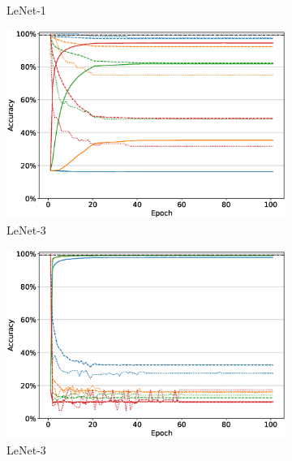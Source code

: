 \begin{figure}
\begin{subfigure}[b]{0.49\textwidth}
         \caption{LeNet-1}
         \label{fig:finetuning_lenet1_largelr}
     \end{subfigure}
     \begin{subfigure}[b]{0.49\textwidth}
         \centering
         \includegraphics[width=\textwidth]{images/finetuning/finetuning_protecting_content_smalllr_thesis_lenet3.eps}
         \caption{LeNet-3}
         \label{fig:finetuning_lenet3_smalllr}
     \end{subfigure}
     \hfill
     \begin{subfigure}[b]{0.49\textwidth}
         \centering
         \includegraphics[width=\textwidth]{images/finetuning/finetuning_protecting_content_largelr_thesis_lenet3.eps}
         \caption{LeNet-3}
         \label{fig:finetuning_lenet3_largelr}
     \end{subfigure}
     \hfill
     \begin{subfigure}[b]{0.49\textwidth}

\end{subfigure}
\end{figure}
